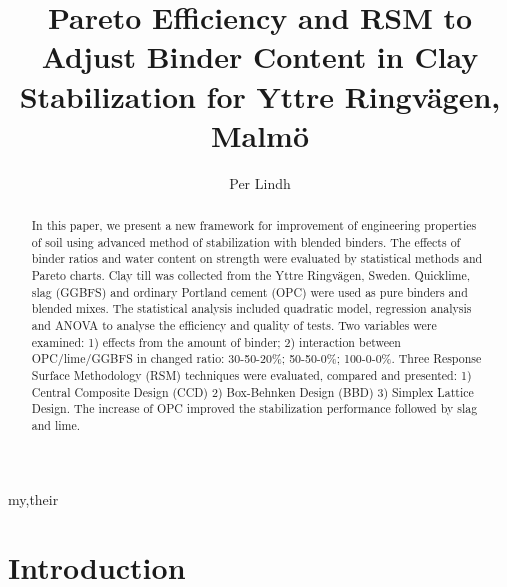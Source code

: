 \documentclass[eprint,
]{actapoly}
\begin{document}
\title[Pareto Efficiency and RSM to Adjust Binder Content]
{Pareto Efficiency and RSM to Adjust Binder Content in Clay Stabilization for Yttre Ringvägen, Malmö}

\author[P. Lindh]{Per Lindh}{my,their}


\begin{abstract}
In this paper, we present a new framework for improvement of engineering properties of soil using advanced method of stabilization with blended binders. The effects of binder ratios and water content on strength were evaluated by statistical methods and Pareto charts. Clay till was collected from the Yttre Ringvägen, Sweden. Quicklime, slag (GGBFS) and ordinary Portland cement (OPC) were used as pure binders and blended mixes. The statistical analysis included quadratic model, regression analysis and ANOVA to analyse the efficiency and quality of tests. Two variables were examined: 1) effects from the amount of binder; 2) interaction between OPC/lime/GGBFS in changed ratio: 30-50-20\%; 50-50-0\%; 100-0-0\%. Three Response Surface Methodology (RSM) techniques were evaluated, compared and presented: 1) Central Composite Design (CCD) 2) Box-Behnken Design (BBD) 3) Simplex Lattice Design. The increase of OPC improved the stabilization performance followed by slag and lime.
\end{abstract}


\maketitle

\section{Introduction}
\end{document}
